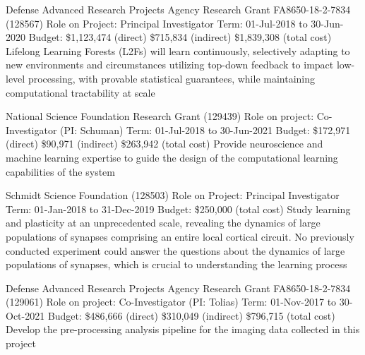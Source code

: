 \documentclass[10pt,colorlinks=true,urlcolor=blue]{moderncv}
\begin{document}
{\newline Defense Advanced Research Projects Agency Research Grant FA8650-18-2-7834
(128567)
\newline Role on Project: Principal Investigator
\newline Term: 01-Jul-2018 to 30-Jun-2020
\newline Budget: \$1,123,474 (direct) \$715,834 (indirect) \$1,839,308 (total cost)
\newline Lifelong Learning Forests (L2Fs) will learn continuously, selectively adapting to new
environments and circumstances utilizing top-down feedback to impact low-level
processing, with provable statistical guarantees, while maintaining computational tractability
at scale}{}{}{}{}

{\newline National Science Foundation Research Grant (129439)
\newline Role on project: Co-Investigator (PI: Schuman)
\newline Term: 01-Jul-2018 to 30-Jun-2021
\newline Budget: \$172,971 (direct) \$90,971 (indirect) \$263,942 (total cost)
\newline Provide neuroscience and machine learning expertise to guide the design of the
computational learning capabilities of the system}{}{}{}{}

{\newline Schmidt Science Foundation (128503)
\newline Role on Project: Principal Investigator
\newline Term: 01-Jan-2018 to 31-Dec-2019
\newline Budget: \$250,000 (total cost)
\newline Study learning and plasticity at an unprecedented scale, revealing the dynamics of large
populations of synapses comprising an entire local cortical circuit. No previously conducted
experiment could answer the questions about the dynamics of large populations of
synapses, which is crucial to understanding the learning process}{}{}{}{}

{\newline Defense Advanced Research Projects Agency Research Grant FA8650-18-2-7834 (129061)
\newline Role on project: Co-Investigator (PI: Tolias)
\newline Term: 01-Nov-2017 to 30-Oct-2021
\newline Budget: \$486,666 (direct) \$310,049 (indirect) \$796,715 (total cost)
\newline Develop the pre-processing analysis pipeline for the imaging data collected in this project}{}{}{}{}
\end{document}
